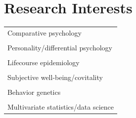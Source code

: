 \documentclass[11pt]{article}
\begin{document}
\section*{Research Interests}
\begin{tabular}{p{15cm}}
  Comparative psychology \\ \\

  Personality/differential psychology \\ \\

  Lifecourse epidemiology \\ \\
  
  Subjective well-being/covitality \\ \\

  Behavior genetics \\ \\
        
  Multivariate statistics/data science
\end{tabular}
\end{document}

